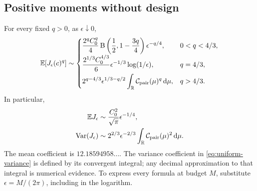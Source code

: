 \subsection{Positive moments without design}
\begin{theorem}\label{thm:uniform-moments}
For every fixed $q>0$, as $\epsilon\downarrow0$,
\begin{equation}\label{eq:uniform-moments}
 \mathbb E[J_\epsilon(c)^q]\sim
 \begin{cases}
 \displaystyle\frac{2^qC_0^q}{4}
 \operatorname{B}\left(\frac12,1-\frac{3q}{4}\right)\epsilon^{-q/4},
                         &0<q<4/3,\\[6pt]
 \displaystyle\frac{2^{1/3}C_0^{4/3}}6
       \epsilon^{-1/3}\log(1/\epsilon),&q=4/3,\\[6pt]
 \displaystyle2^{q-4/3}\epsilon^{1/3-q/2}
       \int_\mathbb R\mathcal C_{\rm pair}(\mu)^q\,\mathrm d\mu,&q>4/3.
 \end{cases}
\end{equation}
In particular,
\begin{align}
 \mathbb E J_\epsilon&\sim\frac{C_0^2}{\sqrt\pi}\epsilon^{-1/4},
                                  \label{eq:uniform-mean}\\
 \operatorname{Var}(J_\epsilon)&\sim2^{2/3}\epsilon^{-2/3}
                     \int_\mathbb R\mathcal C_{\rm pair}(\mu)^2\,\mathrm d\mu.
                                  \label{eq:uniform-variance}
\end{align}
The mean coefficient is $12.18594958\ldots$. The variance coefficient
in \eqref{eq:uniform-variance} is defined by its convergent integral;
any decimal approximation to that integral is numerical evidence.
To express every formula at budget $M$, substitute $\epsilon=M/(2\pi)$,
including in the logarithm.
\end{theorem}
